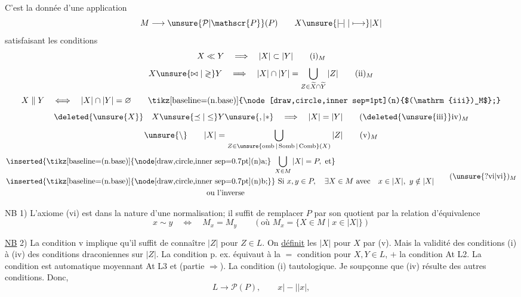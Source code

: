 
C'est la donnée d'une application
\[
M\longrightarrow\unsure{\mathcal{P}|\mathscr{P}}(P)\qquad
X\unsure{\mathrel{\vert\!{-}\!\vert}|\longmapsto}|X|
\]
satisfaisant les conditions
\[
X\ll Y\quad\Longrightarrow\quad |X|\subset |Y|
\tag*{$(\mathrm{i})_M$}
\]
\[
X\unsure{\bowtie|\mathrel{\gtrless}}Y\quad\Longrightarrow\quad
|X|\cap|Y|=\bigcup_{Z\in\widetilde X\cap\widetilde Y}|Z|
\tag*{$(\mathrm{ii})_M$}
\]
\[
X\parallel Y\quad\Longleftrightarrow\quad |X|\cap|Y|=\varnothing
\tag*{\tikz[baseline=(n.base)]{\node[draw,circle,inner sep=1pt](n){$(\mathrm{iii})_M$};}}
\]
\[
\deleted{\unsure{X}}\quad X\unsure{\preceq|\leq}Y\unsure{,|\ast}\quad\Longrightarrow\quad |X|=|Y|
\tag*{$(\deleted{\unsure{\mathrm{iii}}}\mathrm{iv})_M$}
\]
\[
\unsure{\backslash}\qquad |X|=\bigcup_{Z\in\unsure{\operatorname{omb}|\operatorname{Somb}|\operatorname{Comb}}(X)}|Z|
\tag*{$(\mathrm{v})_M$}
\]
\[
\begin{aligned}
&\inserted{\text{\tikz[baseline=(n.base)]{\node[draw,circle,inner sep=0.7pt](n){a};}\ }\bigcup_{X\in M}|X|=P,\ \text{et}}\\
&\inserted{\text{\tikz[baseline=(n.base)]{\node[draw,circle,inner sep=0.7pt](n){b};}}}\ \text{Si }x,y\in P,\quad\exists X\in M\ \text{avec}\quad x\in|X|,\ y\notin|X|\\
&\hspace{26em}\text{ou l'inverse}
\end{aligned}
\tag*{$(\unsure{?\mathrm{vi}|\mathrm{vi}})_M$}
\]

NB 1) L'axiome (vi) est dans la nature d'une normalisation; il suffit de remplacer $P$ par son quotient par la relation d'équivalence
\[
x\sim y\quad\Longleftrightarrow\quad M_x=M_y
\qquad (\text{où }M_x=\{X\in M\mid x\in|X|\})
\]

\uline{NB} 2) La condition v implique qu'il suffit de connaître $|Z|$ pour $Z\in L$.  On \uline{définit} les $|X|$ pour $X$  par (v). Mais la validité des conditions (i) à (iv)  des conditions draconiennes sur $|Z|$. La condition  p. ex. équivaut à la $=$ condition  pour $X,Y\in L$, $+$ la condition At L2. La condition   est automatique moyennant At L3 et  (partie $\Rightarrow$). La condition (i) tautologique. Je soupçonne que (iv) résulte des autres conditions. Donc,   
\[
L\longrightarrow\mathcal{P}(P),\qquad
x\mathrel{\vert\!{-}\!\vert}|x|,
\]
